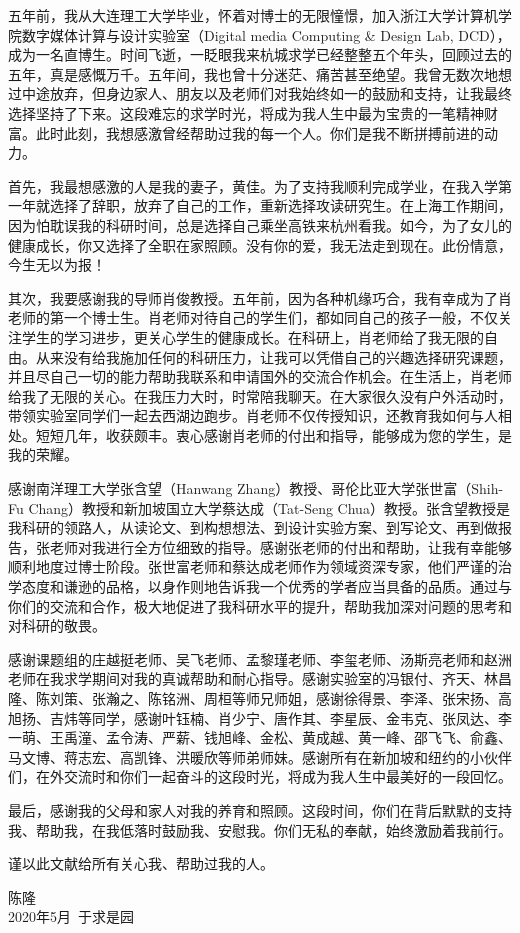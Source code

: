 \begin{thanks}

五年前，我从大连理工大学毕业，怀着对博士的无限憧憬，加入浙江大学计算机学院数字媒体计算与设计实验室（Digital media Computing \& Design Lab, DCD），成为一名直博生。时间飞逝，一眨眼我来杭城求学已经整整五个年头，回顾过去的五年，真是感慨万千。五年间，我也曾十分迷茫、痛苦甚至绝望。我曾无数次地想过中途放弃，但身边家人、朋友以及老师们对我始终如一的鼓励和支持，让我最终选择坚持了下来。这段难忘的求学时光，将成为我人生中最为宝贵的一笔精神财富。此时此刻，我想感激曾经帮助过我的每一个人。你们是我不断拼搏前进的动力。

首先，我最想感激的人是我的妻子，黄佳。为了支持我顺利完成学业，在我入学第一年就选择了辞职，放弃了自己的工作，重新选择攻读研究生。在上海工作期间，因为怕耽误我的科研时间，总是选择自己乘坐高铁来杭州看我。如今，为了女儿的健康成长，你又选择了全职在家照顾。没有你的爱，我无法走到现在。此份情意，今生无以为报！

其次，我要感谢我的导师肖俊教授。五年前，因为各种机缘巧合，我有幸成为了肖老师的第一个博士生。肖老师对待自己的学生们，都如同自己的孩子一般，不仅关注学生的学习进步，更关心学生的健康成长。在科研上，肖老师给了我无限的自由。从来没有给我施加任何的科研压力，让我可以凭借自己的兴趣选择研究课题，并且尽自己一切的能力帮助我联系和申请国外的交流合作机会。在生活上，肖老师给我了无限的关心。在我压力大时，时常陪我聊天。在大家很久没有户外活动时，带领实验室同学们一起去西湖边跑步。肖老师不仅传授知识，还教育我如何与人相处。短短几年，收获颇丰。衷心感谢肖老师的付出和指导，能够成为您的学生，是我的荣耀。

感谢南洋理工大学张含望（Hanwang Zhang）教授、哥伦比亚大学张世富（Shih-Fu Chang）教授和新加坡国立大学蔡达成（Tat-Seng Chua）教授。张含望教授是我科研的领路人，从读论文、到构想想法、到设计实验方案、到写论文、再到做报告，张老师对我进行全方位细致的指导。感谢张老师的付出和帮助，让我有幸能够顺利地度过博士阶段。张世富老师和蔡达成老师作为领域资深专家，他们严谨的治学态度和谦逊的品格，以身作则地告诉我一个优秀的学者应当具备的品质。通过与你们的交流和合作，极大地促进了我科研水平的提升，帮助我加深对问题的思考和对科研的敬畏。

感谢课题组的庄越挺老师、吴飞老师、孟黎瑾老师、李玺老师、汤斯亮老师和赵洲老师在我求学期间对我的真诚帮助和耐心指导。感谢实验室的冯银付、齐天、林昌隆、陈刘策、张瀚之、陈铭洲、周桓等师兄师姐，感谢徐得景、李泽、张宋扬、高旭扬、吉炜等同学，感谢叶钰楠、肖少宁、唐作其、李星辰、金韦克、张凤达、李一萌、王禹潼、孟令涛、严薪、钱旭峰、金松、黄成越、黄一峰、邵飞飞、俞鑫、马文博、蒋志宏、高凯锋、洪暖欣等师弟师妹。感谢所有在新加坡和纽约的小伙伴们，在外交流时和你们一起奋斗的这段时光，将成为我人生中最美好的一段回忆。

最后，感谢我的父母和家人对我的养育和照顾。这段时间，你们在背后默默的支持我、帮助我，在我低落时鼓励我、安慰我。你们无私的奉献，始终激励着我前行。

谨以此文献给所有关心我、帮助过我的人。

\begin{flushright}
	\begin{minipage}{12em}
	\begin{center}
		陈隆
		\\ 2020年5月\ 于求是园
	\end{center}
	\end{minipage}
\end{flushright}

\end{thanks}
